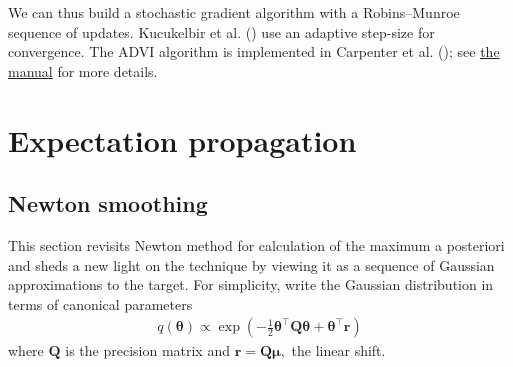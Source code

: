 \documentclass[
  11pt,
  letterpaper,
]{scrbook}
\theoremstyle{plain}
\theoremstyle{definition}
\theoremstyle{definition}
\theoremstyle{plain}
\theoremstyle{plain}
\theoremstyle{definition}
\theoremstyle{remark}
\begin{document}
We can thus build a stochastic gradient algorithm with a Robins--Munroe
sequence of updates. Kucukelbir et al.
() use an adaptive step-size for
convergence. The ADVI algorithm is implemented in Carpenter et al.
(); see
\href{https://mc-stan.org/docs/reference-manual/variational.html}{the
manual} for more details.


\chapter{Expectation propagation}\label{expectation-propagation}

\section{Newton smoothing}\label{newton-smoothing}

This section revisits Newton method for calculation of the maximum a
posteriori and sheds a new light on the technique by viewing it as a
sequence of Gaussian approximations to the target. For simplicity, write
the Gaussian distribution in terms of canonical parameters
\begin{align*}
 q(\boldsymbol{\theta}) \propto \exp \left( - \frac{1}{2} \boldsymbol{\theta}^\top \mathbf{Q}\boldsymbol{\theta} + \boldsymbol{\theta}^\top \boldsymbol{r}\right)
\end{align*} where \(\mathbf{Q}\) is the precision matrix and
\(\boldsymbol{r}=\mathbf{Q}\boldsymbol{\mu},\) the linear shift.
\end{document}
